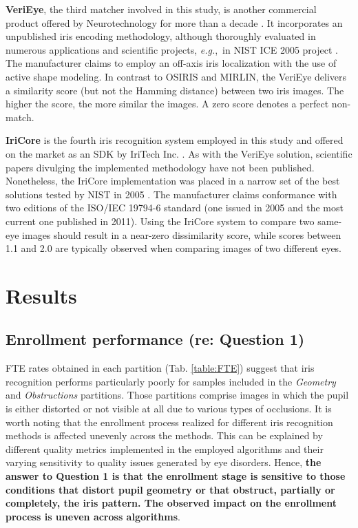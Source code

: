 \documentclass[article,12pt]{elsarticle}
\newcommand{\eg}{{\it e.g.},~}
\begin{document}
\textbf{VeriEye}, the third matcher involved in this study, is another commercial product offered by Neurotechnology for more than a decade \cite{VeriEye}. It incorporates an unpublished iris encoding methodology, although thoroughly evaluated in numerous applications and scientific projects, \eg in NIST ICE 2005 project \cite{ICE2005}. The manufacturer claims to employ an off-axis iris localization with the use of active shape modeling. In contrast to OSIRIS and MIRLIN, the VeriEye delivers a similarity score (but not the Hamming distance) between two iris images. The higher the score, the more similar the images. A zero score denotes a perfect non-match.

\textbf{IriCore} is the fourth iris recognition system employed in this study and offered on the market as an SDK by IriTech Inc. \cite{IriCore}. As with the VeriEye solution, scientific papers divulging the implemented methodology have not been published. Nonetheless, the IriCore implementation was placed in a narrow set of the best solutions tested by NIST in 2005 \cite{ICE2005}. The manufacturer claims conformance with two editions of the ISO/IEC 19794-6 standard (one issued in 2005 and the most current one published in 2011). Using the IriCore system to compare two same-eye images should result in a near-zero dissimilarity score, while scores between 1.1 and 2.0 are typically observed when comparing images of two different eyes.



\section{Results}
\label{experiments}
\subsection{Enrollment performance (re: Question 1)} 

FTE rates obtained in each partition (Tab. \ref{table:FTE}) suggest that iris recognition performs particularly poorly for samples included in the \emph{Geometry} and \emph{Obstructions} partitions. Those partitions comprise images in which the pupil is either distorted or not visible at all due to various types of occlusions. It is worth noting that the enrollment process realized for different iris recognition methods is affected unevenly across the methods. This can be explained by different quality metrics implemented in the employed algorithms and their varying sensitivity to quality issues generated by eye disorders. Hence, \textbf{the answer to Question 1 is that the enrollment stage is sensitive to those conditions that distort pupil geometry or that obstruct, partially or completely, the iris pattern. The observed impact on the enrollment process is uneven across algorithms}.
\end{document}
